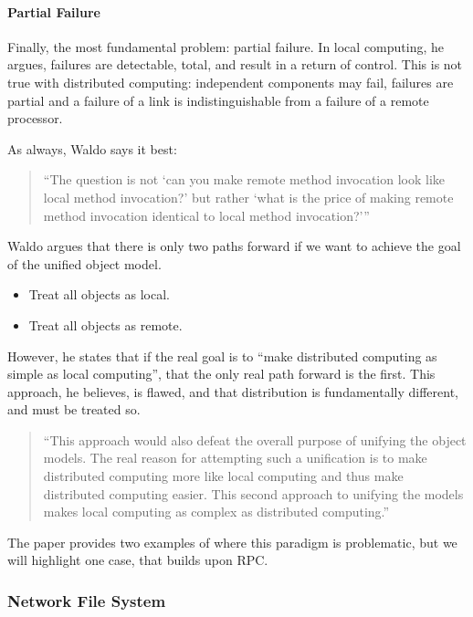 \paragraph{Partial Failure} Finally, the most fundamental problem: partial failure.  In local computing, he argues, failures are detectable, total, and result in a return of control.  This is not true with distributed computing: independent components may fail, failures are partial and a failure of a link is indistinguishable from a failure of a remote processor.

As always, Waldo says it best:

\begin{quote}
``The question is not `can you make remote method invocation look like local method invocation?' but rather `what is the price of making remote method invocation identical to local method invocation?'''~\cite{kendall1994note}
\end{quote}

Waldo argues that there is only two paths forward if we want to achieve the goal of the unified object model.

\begin{itemize}
\item Treat all objects as local.
\item Treat all objects as remote.
\end{itemize}

However, he states that if the real goal is to ``make distributed computing as simple as local computing'', that the only real path forward is the first.  This approach, he believes, is flawed, and that distribution is fundamentally different, and must be treated so.

\begin{quote}
``This approach would also defeat the overall purpose of unifying
the object models. The real reason for attempting such a
unification is to make distributed computing more like local
computing and thus make distributed computing easier. This
second approach to unifying the models makes local computing
as complex as distributed computing.''~\cite{kendall1994note}	
\end{quote}

The paper provides two examples of where this paradigm is problematic, but we will highlight one case, that builds upon RPC.

\subsubsection{Network File System}

